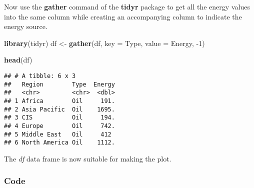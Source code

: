 \documentclass[]{book}
\newenvironment{Shaded}{\begin{snugshade}}{\end{snugshade}}
\newcommand{\DataTypeTok}[1]{\textcolor[rgb]{0.13,0.29,0.53}{#1}}
\newcommand{\DecValTok}[1]{\textcolor[rgb]{0.00,0.00,0.81}{#1}}
\newcommand{\KeywordTok}[1]{\textcolor[rgb]{0.13,0.29,0.53}{\textbf{#1}}}
\newcommand{\NormalTok}[1]{#1}
\newcommand{\StringTok}[1]{\textcolor[rgb]{0.31,0.60,0.02}{#1}}
\begin{document}
Now use the \textbf{gather} command of the \textbf{tidyr} package to get all the energy values into the same column while creating an accompanying column to indicate the energy source.

\begin{Shaded}
\begin{Highlighting}[]
\KeywordTok{library}\NormalTok{(tidyr)}
\NormalTok{df <-}\StringTok{ }\KeywordTok{gather}\NormalTok{(df, }\DataTypeTok{key =}\NormalTok{ Type, }\DataTypeTok{value =}\NormalTok{ Energy, }\DecValTok{-1}\NormalTok{)}

\KeywordTok{head}\NormalTok{(df)}
\end{Highlighting}
\end{Shaded}

\begin{verbatim}
## # A tibble: 6 x 3
##   Region        Type  Energy
##   <chr>         <chr>  <dbl>
## 1 Africa        Oil     191.
## 2 Asia Pacific  Oil    1695.
## 3 CIS           Oil     194.
## 4 Europe        Oil     742.
## 5 Middle East   Oil     412 
## 6 North America Oil    1112.
\end{verbatim}

The \emph{df} data frame is now suitable for making the plot.

\hypertarget{energy18code}{%
\subsubsection*{Code}\label{energy18code}}
\end{document}
